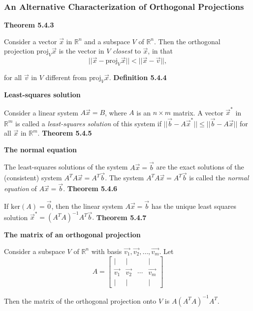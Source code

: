 \subsubsection*{An Alternative Characterization of Orthogonal Projections}
\textbf{Theorem 5.4.3}\\
\par\noindent Consider a vector $\vec{x}$ in $\mathbb{R}^{n}$ and a subspace $V$ of $\mathbb{R}^{n}$. Then the orthogonal projection $\textrm{proj}_{V}\vec{x}$ is the vector in $V$ \textit{closest} to $\vec{x}$, in that
\[||\vec{x}-\textrm{proj}_{V}\vec{x}||<{}||\vec{x}-\vec{v}||,\]
\par\noindent for all $\vec{v}$ in $V$ different from $\textrm{proj}_{V}\vec{x}$.
\textbf{Definition 5.4.4}\\
\par\noindent\textbf{Least-squares solution}
\par\noindent Consider a linear system $A\vec{x}=B$, where $A$ is an $n\times{}m$ matrix. A vector $\vec{x}^{*}$ in $\mathbb{R}^{m}$ is called a \textit{least-squares solution} of this system if $||\vec{b}-A\vec{x}^{*}||\le{}||\vec{b}-A\vec{x}||$ for all $\vec{x}$ in $\mathbb{R}^{m}$.
\textbf{Theorem 5.4.5}\\
\par\noindent\textbf{The normal equation}
\par\noindent The least-squares solutions of the system $A\vec{x}=\vec{b}$ are the exact solutions of the (consistent) system $A^{T}A\vec{x}=A^{T}\vec{b}$. The system $A^{T}A\vec{x}=A^{T}\vec{b}$ is called the \textit{normal equation} of $A\vec{x}=\vec{b}$.
\textbf{Theorem 5.4.6}\\
\par\noindent If $\textrm{ker}(A)={\vec{0}}$, then the linear system $A\vec{x}=\vec{b}$ has the unique least squares solution $\vec{x}^{*}=(A^{T}A)^{-1}A^{T}\vec{b}.$
\textbf{Theorem 5.4.7}\\
\par\noindent\textbf{The matrix of an orthogonal projection}
\par\noindent Consider a subspace $V$ of $\mathbb{R}^{n}$ with basis $\vec{v_{1}},\vec{v_{2}},\ldots{},\vec{v_{m}}$. Let
\[A=\left[\begin{array}{cccc}|&|&&|\\{}\vec{v_{1}}&\vec{v_{2}}&\cdots{}&\vec{v_{m}}\\{}|&|&&|\end{array}\right]\]
\par\noindent Then the matrix of the orthogonal projection onto $V$ is $A(A^{T}A)^{-1}A^{T}$.

